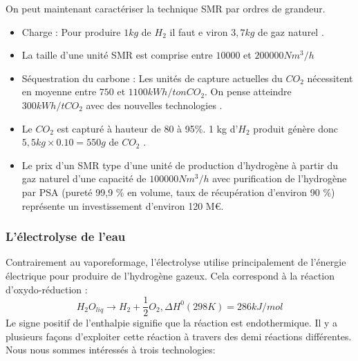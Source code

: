 \documentclass[11pt,french,a4paper]{article}
\begin{document}
On peut maintenant caractériser la technique SMR par ordres de grandeur.
\begin{itemize}
\item Charge : Pour produire $1kg$ de $H_2$ il faut e viron $3,7kg$ de gaz naturel \cite{Prod_gaz_synth}.
\item La taille d'une unité SMR est comprise entre $10000$ et $200000 Nm^3/h$  \cite{Prod_gaz_synth}
\item Séquestration du carbone : Les unités de capture actuelles du $CO_2$ nécessitent en moyenne entre $750$ et $1100kWh/ton CO_2$. On pense atteindre $300 kWh/t CO_2$ avec des nouvelles technologies \cite{Surla2019}.
\item Le $CO_2$ est capturé à hauteur de 80 à 95\%. 1 kg d'$H_2$ produit génère donc $ 5,5 kg \times 0.10 = 550 g$ de $CO_2$ \cite{Surla2019}.
\item Le prix d'un SMR type d'une unité de production d’hydrogène à partir du gaz naturel d’une capacité de $100000 Nm^3/h$ avec purification de l’hydrogène par PSA (pureté 99,9 \% en volume, taux de récupération d’environ 90 \%) représente un investissement d’environ 120 M€.
\end{itemize}


\subsubsection{L'électrolyse de l'eau}

Contrairement au vaporeformage, l’électrolyse utilise principalement de l’énergie électrique pour produire de l’hydrogène gazeux. Cela correspond à la réaction d'oxydo-réduction : 
$$H_2O_{liq} \rightarrow H_2 + \frac{1}{2} O_2 , \Delta H^0 (298 K) = 286 kJ/mol $$
Le signe positif de l’enthalpie signifie que la réaction est endothermique.
Il y a plusieurs façons d’exploiter cette réaction à travers des demi réactions différentes. Nous nous sommes intéressés à trois technologies:\\
\end{document}
